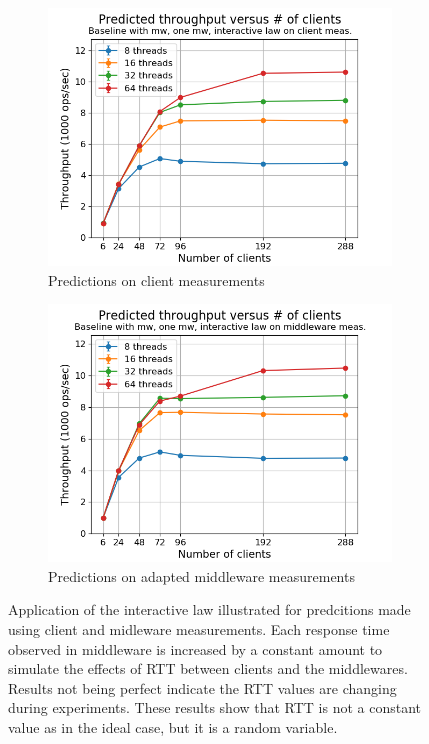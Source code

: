 \documentclass[11pt,a4paper]{article}
\begin{document}
\begin{figure}[h]
\centering
\begin{subfigure}{.5\textwidth}
  \centering
  \includegraphics[width=1.0\linewidth,trim={5px 0px 20px 0px},clip]{img/plot/mwb2-wo-tp_law_cli.png}
  \caption{Predictions on client measurements}
  \label{fig:mwb2-wo-tp_law_cli}
\end{subfigure}%
\begin{subfigure}{.5\textwidth}
  \centering
  \includegraphics[width=1.0\linewidth,trim={5px 0px 20px 0px},clip]{img/plot/mwb2-wo-tp_law_mw.png}
  \caption{Predictions on adapted middleware measurements}
  \label{fig:mwb2-wo-tp_law_mw}
\end{subfigure}
\caption{Application of the interactive law illustrated for predcitions made using client and midleware measurements. Each response time observed in middleware is increased by a constant amount to simulate the effects of RTT between clients and the middlewares. Results not being perfect indicate the RTT values are changing during experiments. These results show that RTT is not a constant value as in the ideal case, but it is a random variable.}
\label{fig:mwb2-wo-tp_law}
\end{figure}
\end{document}

